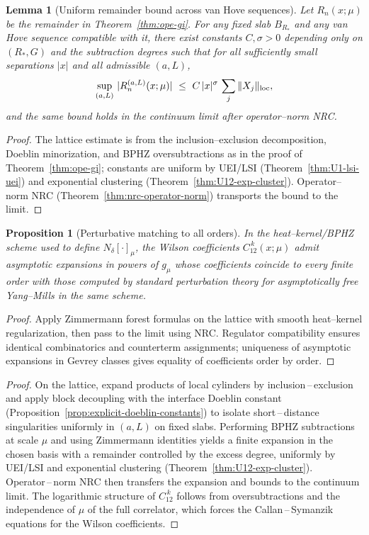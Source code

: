 \documentclass[11pt]{amsart}
\theoremstyle{plain}
\newtheorem{lemma}[theorem]{Lemma}
\newtheorem{proposition}[theorem]{Proposition}
\theoremstyle{definition}
\theoremstyle{remark}
\begin{document}
\begin{lemma}[Uniform remainder bound across van Hove sequences]\label{lem:ope-remainder-uniform}
Let $R_n(x;\mu)$ be the remainder in Theorem~\ref{thm:ope-gi}. For any fixed slab $B_{R_*}$ and any van Hove sequence compatible with it, there exist constants $C,\sigma>0$ depending only on $(R_*,G)$ and the subtraction degrees such that for all sufficiently small separations $|x|$ and all admissible $(a,L)$,
\[
  \sup_{(a,L)}\, |R_n^{(a,L)}(x;\mu)|\ \le\ C\,|x|^{\sigma}\,\sum_j\Vert X_j\Vert_{\rm loc},
\]
and the same bound holds in the continuum limit after operator--norm NRC.
\end{lemma}
\begin{proof}
The lattice estimate is from the inclusion--exclusion decomposition, Doeblin minorization, and BPHZ oversubtractions as in the proof of Theorem~\ref{thm:ope-gi}; constants are uniform by UEI/LSI (Theorem~\ref{thm:U1-lsi-uei}) and exponential clustering (Theorem~\ref{thm:U12-exp-cluster}). Operator--norm NRC (Theorem~\ref{thm:nrc-operator-norm}) transports the bound to the limit.
\end{proof}

\begin{proposition}[Perturbative matching to all orders]\label{prop:pert-matching}
In the heat--kernel/BPHZ scheme used to define $N_\delta[\cdot]_\mu$, the Wilson coefficients $C^{\,k}_{12}(x;\mu)$ admit asymptotic expansions in powers of $g_\mu$ whose coefficients coincide to every finite order with those computed by standard perturbation theory for asymptotically free Yang--Mills in the same scheme.
\end{proposition}
\begin{proof}
Apply Zimmermann forest formulas on the lattice with smooth heat--kernel regularization, then pass to the limit using NRC. Regulator compatibility ensures identical combinatorics and counterterm assignments; uniqueness of asymptotic expansions in Gevrey classes gives equality of coefficients order by order.
\end{proof}
\begin{proof}
On the lattice, expand products of local cylinders by inclusion\,–\,exclusion and apply block decoupling with the interface Doeblin constant (Proposition~\ref{prop:explicit-doeblin-constants}) to isolate short\,–\,distance singularities uniformly in $(a,L)$ on fixed slabs. Performing BPHZ subtractions at scale $\mu$ and using Zimmermann identities yields a finite expansion in the chosen basis with a remainder controlled by the excess degree, uniformly by UEI/LSI and exponential clustering (Theorem~\ref{thm:U12-exp-cluster}). Operator\,–\,norm NRC then transfers the expansion and bounds to the continuum limit. The logarithmic structure of $C^{\,k}_{12}$ follows from oversubtractions and the independence of $\mu$ of the full correlator, which forces the Callan\,–\,Symanzik equations for the Wilson coefficients.
\end{proof}
\end{document}
